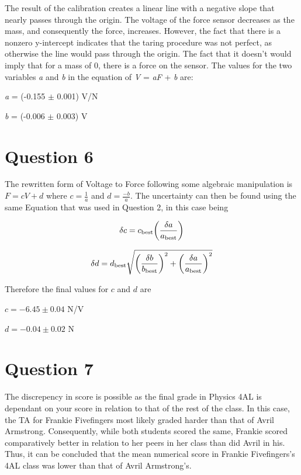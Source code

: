 \documentclass[titlepage]{article}
\begin{document}
The result of the calibration creates a linear line with a negative slope that nearly passes through the origin. The voltage of the force sensor decreases as the mass, and consequently the force, increases. However, the fact that there is a nonzero y-intercept indicates that the taring procedure was not perfect, as otherwise the line would pass through the origin. The fact that it doesn't would imply that for a mass of 0, there is a force on the sensor. The values for the two variables \textit{a} and \textit{b} in the equation of \textit{V} = \textit{aF} + \textit{b} are:

\begin{center}
\textit{a} = (-0.155 $\pm$ 0.001) V/N
\end{center}

\begin{center}
\textit{b} = (-0.006 $\pm$ 0.003) V
\end{center}

\section*{Question 6}

The rewritten form of Voltage to Force following some algebraic manipulation is $F = cV + d$ where $c = \frac{1}{a}$ and $d = \frac{-b}{a}$. The uncertainty can then be found using the same Equation that was used in Question 2, in this case being

\[
\delta c = c\textsubscript{best}\bigg (\frac{\delta a}{a\textsubscript{best}}\bigg ) 
\]

\[
\delta d = d\textsubscript{best} \sqrt{\bigg (\frac{\delta b}{b\textsubscript{best}}\bigg )^2  + \bigg (\frac{\delta a}{a\textsubscript{best}}\bigg )^2}
\]

\begin{center}
Therefore the final values for $c$ and $d$ are
\end{center}

\begin{center}
$c = -6.45 \pm 0.04$ N/V
\end{center}

\begin{center}
$d = -0.04 \pm 0.02$ N
\end{center}

\section*{Question 7}

The discrepency in score is possible as the final grade in Physics 4AL is dependant on your score in relation to that of the rest of the class. In this case, the TA for Frankie Fivefingers most likely graded harder than that of Avril Armstrong. Consequently, while both students scored the same, Frankie scored comparatively better in relation to her peers in her class than did Avril in his. Thus, it can be concluded that the mean numerical score in Frankie Fivefingers's 4AL class was lower than that of Avril Armstrong's.
\end{document}
